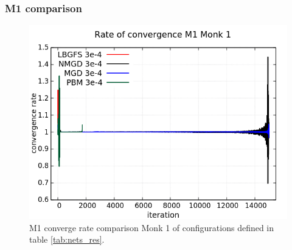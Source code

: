 \subsubsection{M1 comparison}
\begin{figure}[H]
	\centering
	\includegraphics[width=0.6\linewidth]{data/Comparison/Monk1/Monk1_M1_CR_standard.png}
	\caption{M1 converge rate comparison Monk 1 of configurations defined in table \ref{tab:nets_res}.}
	\label{fig:CR-M1-Monk1-Standard}
\end{figure}

